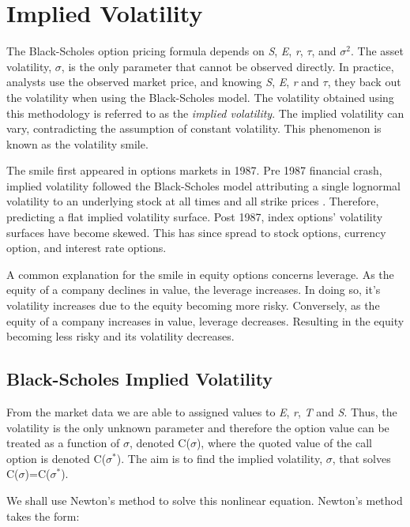 \documentclass[a4paper]{article}
\begin{document}
\section{Implied Volatility}



The Black-Scholes option pricing formula depends on \textit{S}, \textit{E}, \textit{r}, $\tau$, and $\sigma^2$. The asset volatility, $\sigma$, is the only parameter that cannot be observed directly. In practice, analysts use the observed market price, and  knowing \textit{S}, \textit{E}, \textit{r} and $\tau$, they back out the volatility when using the Black-Scholes model. The volatility obtained using this methodology is referred to as the \textit{implied volatility}. The implied volatility can vary, contradicting the assumption of constant volatility. This phenomenon is known as the volatility smile.

The smile first appeared in options markets in 1987. Pre 1987 financial crash, implied volatility followed the Black-Scholes model attributing a single lognormal volatility to an underlying stock at all times and all strike prices \cite{Smile}. Therefore, predicting a flat implied volatility surface. Post 1987, index options' volatility surfaces have become skewed. This has since spread to stock options, currency option, and interest rate options.

A common explanation for the smile in equity options concerns leverage. As the equity of a company declines in value, the leverage increases. In doing so, it's volatility increases due to the equity becoming more risky. Conversely, as the equity of a company increases in value, leverage decreases. Resulting in the equity becoming less risky and its volatility decreases.

\subsection{Black-Scholes Implied Volatility} \label{sec:BS_Imp_Vol_New}

From the market data we are able to assigned values to \textit{E}, \textit{r}, \textit{T} and \textit{S}. Thus, the volatility is the only unknown parameter and therefore the option value can be treated as a function of $\sigma$, denoted C($\sigma$), where the quoted value of the call option is denoted C($\sigma^*$). The aim is to find the implied volatility, $\sigma$, that solves C($\sigma$)=C($\sigma^*$).

We shall use Newton's method to solve this nonlinear equation. Newton's method takes the form:
\end{document}
